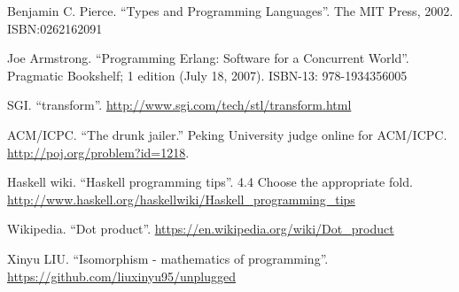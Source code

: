 \begin{thebibliography}{99}
Benjamin C. Pierce. ``Types and Programming Languages''. The MIT Press, 2002. ISBN:0262162091

Joe Armstrong. ``Programming Erlang: Software for a Concurrent World''. Pragmatic Bookshelf; 1 edition (July 18, 2007). ISBN-13: 978-1934356005

SGI. ``transform''. \url{http://www.sgi.com/tech/stl/transform.html}

ACM/ICPC. ``The drunk jailer.'' Peking University judge online for ACM/ICPC. \url{http://poj.org/problem?id=1218}.

Haskell wiki. ``Haskell programming tips''. 4.4 Choose the appropriate fold. \url{http://www.haskell.org/haskellwiki/Haskell_programming_tips}

Wikipedia. ``Dot product''. \url{https://en.wikipedia.org/wiki/Dot_product}

Xinyu LIU. ``Isomorphism - mathematics of programming''. \url{https://github.com/liuxinyu95/unplugged}

\end{thebibliography}
